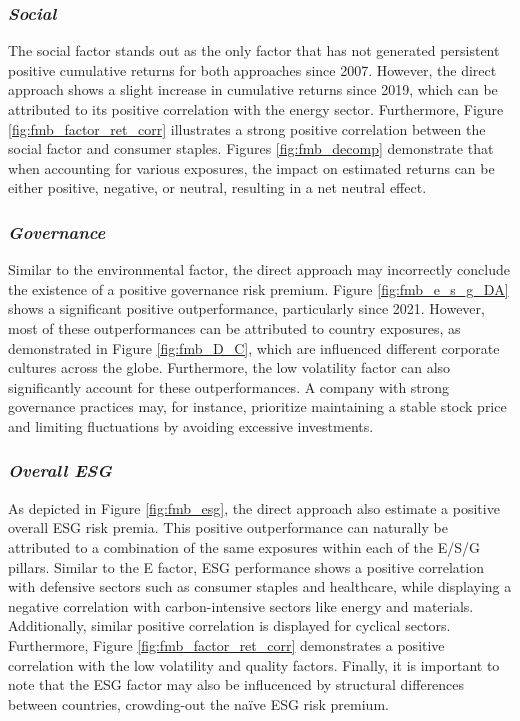 \documentclass[11pt,a4paper]{article}
\begin{document}
\subsubsection*{\textit{Social}}

The social factor stands out as the only factor that has not generated persistent positive cumulative returns for both approaches since 2007. 
However, the direct approach shows a slight increase in cumulative returns since 2019, which can be attributed to its positive correlation with the energy sector.
Furthermore, Figure \ref{fig:fmb_factor_ret_corr} illustrates a strong positive correlation between the social factor and consumer staples.
Figures \ref{fig:fmb_decomp} demonstrate that when accounting for various exposures, the impact on estimated returns can be either positive, negative, or neutral, resulting in a net neutral effect.

\subsubsection*{\textit{Governance}}

Similar to the environmental factor, the direct approach may incorrectly conclude the existence of a positive governance risk premium. 
Figure \ref{fig:fmb_e_s_g_DA} shows a significant positive outperformance, particularly since 2021.
However, most of these outperformances can be attributed to country exposures, as demonstrated in Figure \ref{fig:fmb_D_C}, which are influenced different corporate cultures across the globe.
Furthermore, the low volatility factor can also significantly account for these outperformances. 
A company with strong governance practices may, for instance, prioritize maintaining a stable stock price and limiting fluctuations by avoiding excessive investments.

\subsubsection*{\textit{Overall ESG}}

As depicted in Figure \ref{fig:fmb_esg}, the direct approach also estimate a positive overall ESG risk premia. 
This positive outperformance can naturally be attributed to a combination of the same exposures within each of the E/S/G pillars.
Similar to the E factor, ESG performance shows a positive correlation with defensive sectors such as consumer staples and healthcare, while displaying a negative correlation with carbon-intensive sectors like energy and materials.
Additionally, similar positive correlation is displayed for cyclical sectors. 
Furthermore, Figure \ref{fig:fmb_factor_ret_corr} demonstrates a positive correlation with the low volatility and quality factors. 
Finally, it is important to note that the ESG factor may also be influcenced by structural differences between countries, crowding-out the naïve ESG risk premium.
\end{document}
